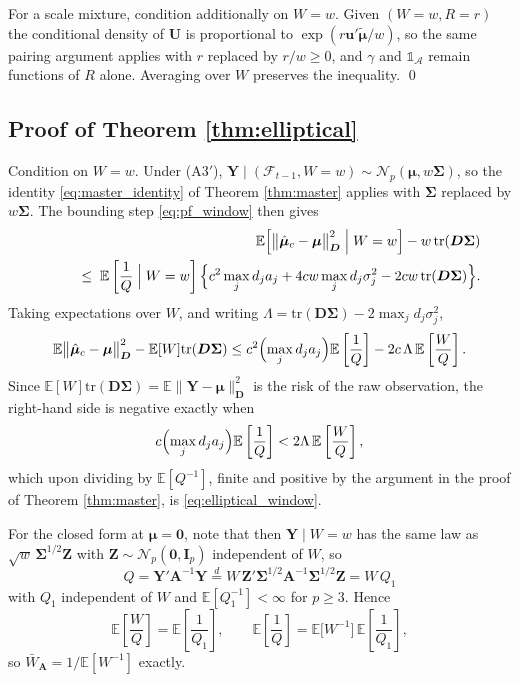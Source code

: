 \documentclass[a4paper,fleqn]{cas-sc}
\theoremstyle{plain}
\theoremstyle{definition}
\theoremstyle{remark}
\newcommand{\tr}{\mathrm{tr}}
\newcommand{\E}{\mathbb{E}}
\begin{document}
\begin{appendices}
For a scale mixture, condition additionally on $W=w$. Given $(W=w,R=r)$ the conditional density of $\bm U$ is proportional to $\exp(r\bm u'\widetilde{\bm\mu}/w)$, so the same pairing argument applies with $r$ replaced by $r/w\ge0$, and $\gamma$ and $\mathbb 1_{\mathcal A}$ remain functions of $R$ alone. Averaging over $W$ preserves the inequality. \qed

\subsection*{Proof of Theorem \ref{thm:elliptical}}

Condition on $W=w$. Under (A3$'$), $\bm Y\mid(\mathcal F_{t-1},W=w)\sim\mathcal N_p(\bm\mu,w\bm\Sigma)$, so the identity \eqref{eq:master_identity} of Theorem \ref{thm:master} applies with $\bm\Sigma$ replaced by $w\bm\Sigma$. The bounding step \eqref{eq:pf_window} then gives
\begin{eqnarray}
&&\E\Bigl[\bigl\|\hat{\bm\mu}_c-\bm\mu\bigr\|^2_{\bm D}\Bigm| W=w\Bigr]-w\,\tr(\bm D\bm\Sigma)
\cr
&&\qquad\le\;
\E\left[\frac1Q\Bigm| W=w\right]
\Bigl\{
c^{2}\max_j d_ja_j+4cw\max_jd_j\sigma^2_j-2cw\,\tr(\bm D\bm\Sigma)
\Bigr\}.
\end{eqnarray}
Taking expectations over $W$, and writing $\Lambda=\tr(\bm D\bm\Sigma)-2\max_jd_j\sigma^2_j$,
\begin{equation}
\E\bigl\|\hat{\bm\mu}_c-\bm\mu\bigr\|^2_{\bm D}-\E[W]\tr(\bm D\bm\Sigma)
\le
c^{2}\Bigl(\max_jd_ja_j\Bigr)\E\left[\frac1Q\right]
-2c\,\Lambda\,\E\left[\frac{W}{Q}\right].
\end{equation}
Since $\E[W]\tr(\bm D\bm\Sigma)=\E\|\bm Y-\bm\mu\|^2_{\bm D}$ is the risk of the raw observation, the right-hand side is negative exactly when
\begin{equation}
c\Bigl(\max_jd_ja_j\Bigr)\E\left[\frac1Q\right]<2\Lambda\,\E\left[\frac WQ\right],
\end{equation}
which upon dividing by $\E[Q^{-1}]$, finite and positive by the argument in the proof of Theorem \ref{thm:master}, is \eqref{eq:elliptical_window}.

For the closed form at $\bm\mu=\bm 0$, note that then $\bm Y\mid W=w$ has the same law as $\sqrt w\,\bm\Sigma^{1/2}\bm Z$ with $\bm Z\sim\mathcal N_p(\bm 0,\bm I_p)$ independent of $W$, so
\begin{equation}
Q=\bm Y'\bm A^{-1}\bm Y
\stackrel{d}{=}
W\,\bm Z'\bm\Sigma^{1/2}\bm A^{-1}\bm\Sigma^{1/2}\bm Z
=W\,Q_1
\end{equation}
with $Q_1$ independent of $W$ and $\E[Q_1^{-1}]<\infty$ for $p\ge3$. Hence
\begin{equation}
\E\left[\frac WQ\right]=\E\left[\frac{1}{Q_1}\right],
\qquad
\E\left[\frac 1Q\right]=\E\bigl[W^{-1}\bigr]\,\E\left[\frac{1}{Q_1}\right],
\end{equation}
so $\bar W_{\bm A}=1/\E[W^{-1}]$ exactly.


\end{appendices}
\end{document}
